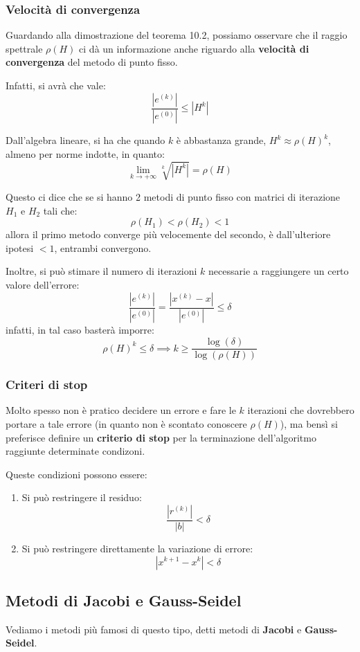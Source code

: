 \documentclass[a4paper,11pt]{article}
\begin{document}
\subsubsection{Velocità di convergenza}
Guardando alla dimostrazione del teorema 10.2, possiamo osservare che il raggio spettrale $\rho(H)$ ci dà un informazione anche riguardo alla \textbf{velocità di convergenza} del metodo di punto fisso.

Infatti, si avrà che vale:
$$
\frac{|e^{(k)}|}{|e^{(0)}|} \leq | H^k |
$$

Dall'algebra lineare, si ha che quando $k$ è abbastanza grande, $H^k \approx \rho(H)^k$, almeno per norme indotte, in quanto:
$$
\lim_{k \rightarrow +\infty} \sqrt[k]{|H^k|} = \rho(H)
$$

Questo ci dice che se si hanno 2 metodi di punto fisso con matrici di iterazione $H_1$ e $H_2$ tali che:
$$
\rho(H_1) < \rho(H_2) < 1
$$
allora il primo metodo converge più velocemente del secondo, è dall'ulteriore ipotesi $<1$, entrambi convergono.

Inoltre, si può stimare il numero di iterazioni $k$ necessarie a raggiungere un certo valore dell'errore:
$$
\frac{ | e^{(k)} | }{ | e^{(0)} | } = \frac{ | x^{(k)} - x | }{ | e^{(0)} | } \leq \delta 
$$
infatti, in tal caso basterà imporre:
$$
\rho(H)^k \leq \delta \implies k \geq \frac{ \log(\delta) }{\log( \rho(H) )}
$$

\subsubsection{Criteri di stop}
Molto spesso non è pratico decidere un errore e fare le $k$ iterazioni che dovrebbero portare a tale errore (in quanto non è scontato conoscere $\rho(H)$), ma bensì si preferisce definire un \textbf{criterio di stop} per la terminazione dell'algoritmo raggiunte determinate condizoni.

Queste condizioni possono essere:
\begin{enumerate}
	\item Si può restringere il residuo:
		$$
			\frac{ | r^{(k)} | }{ | b | } < \delta	
		$$
	\item Si può restringere direttamente la variazione di errore:
		$$
			| x^{k + 1} - x^{k} | < \delta	
		$$
\end{enumerate}

\subsection{Metodi di Jacobi e Gauss-Seidel}
Vediamo i metodi più famosi di questo tipo, detti metodi di \textbf{Jacobi} e \textbf{Gauss-Seidel}.
\end{document}
